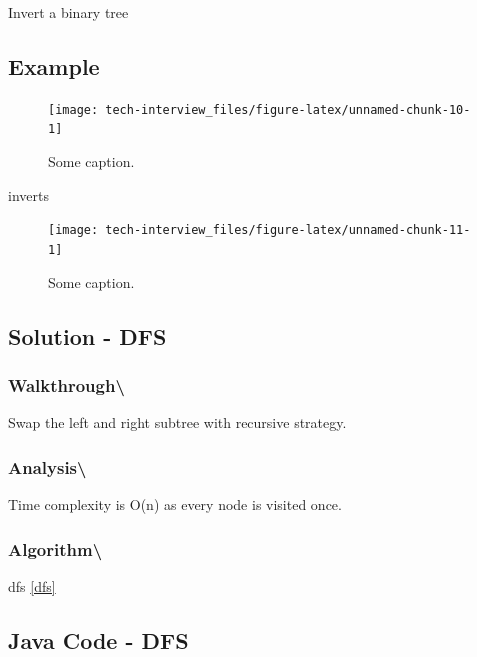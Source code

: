 \documentclass[]{book}
\begin{document}
Invert a binary tree

\hypertarget{example-50}{%
\subsection{Example}\label{example-50}}

\begin{figure}
\texttt{[image: tech-interview\_files/figure-latex/unnamed-chunk-10-1]} \caption{Some caption.}\label{fig:unnamed-chunk-10}
\end{figure}

inverts

\begin{figure}
\texttt{[image: tech-interview\_files/figure-latex/unnamed-chunk-11-1]} \caption{Some caption.}\label{fig:unnamed-chunk-11}
\end{figure}

\hypertarget{solution---dfs-2}{%
\subsection{Solution - DFS}\label{solution---dfs-2}}

\hypertarget{walkthrough-51}{%
\subsubsection{Walkthrough\textbackslash{}}\label{walkthrough-51}}

Swap the left and right subtree with recursive strategy.

\hypertarget{analysis-58}{%
\subsubsection{Analysis\textbackslash{}}\label{analysis-58}}

Time complexity is O(n) as every node is visited once.

\hypertarget{algorithm-60}{%
\subsubsection{Algorithm\textbackslash{}}\label{algorithm-60}}

dfs \ref{dfs}

\hypertarget{java-code---dfs-3}{%
\subsection{Java Code - DFS}\label{java-code---dfs-3}}
\end{document}
